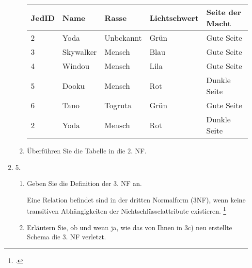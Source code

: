\documentclass{bschlangaul-aufgabe}
\begin{document}
\begin{enumerate}
\begin{enumerate}
\begin{center}
\begin{tabular}{|l|l|l|l|l|}
\hline
JedID & Name      & Rasse     & Lichtschwert & Seite der Macht\\\hline\hline
2     & Yoda      & Unbekannt & Grün         & Gute Seite\\\hline
3     & Skywalker & Mensch    & Blau         & Gute Seite\\\hline
4     & Windou    & Mensch    & Lila         & Gute Seite\\\hline
5     & Dooku     & Mensch    & Rot          & Dunkle Seite\\\hline
6     & Tano      & Togruta   & Grün         & Gute Seite\\\hline
2     & Yoda      & Mensch    & Rot          & Dunkle Seite\\\hline
\end{tabular}
\end{center}


\item Überführen Sie die Tabelle in die 2. NF.
\end{enumerate}


\item 5.

\begin{enumerate}


\item Geben Sie die Definition der 3. NF an.

\begin{bAntwort}
Eine Relation befindet sind in der dritten Normalform (3NF), wenn keine
transitiven Abhängigkeiten der Nichtschlüsselattribute existieren.
\footcite[Seite 449]{schneider}
\end{bAntwort}


\item Erläutern Sie, ob und wenn ja, wie das von Ihnen in 3c) neu
erstellte Schema die 3. NF verletzt.

\end{enumerate}
\end{enumerate}
\end{document}
